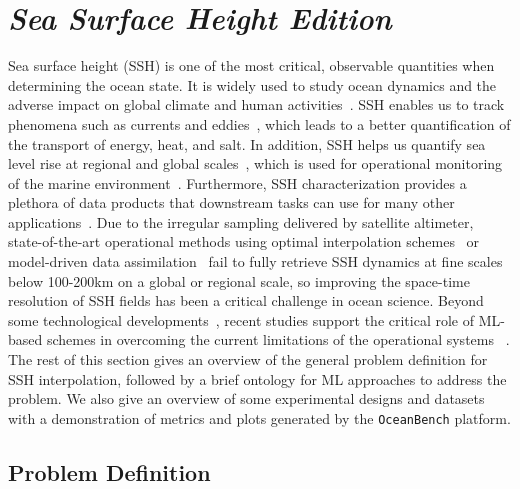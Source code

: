 \section{\textit{Sea Surface Height Edition}}\label{sec:interp_challenge}

Sea surface height (SSH) is one of the most critical, observable quantities when determining the ocean state. 
It is widely used to study ocean dynamics and the adverse impact on global climate and human activities~\cite{SSHMESOSCALE}. 
SSH enables us to track phenomena such as currents and eddies~\cite{SSHMESOSCALE,SSHMESOSCALE2,SSHMESOSCALE3}, which leads to a better quantification of the transport of energy, heat, and salt. 
In addition, SSH helps us quantify sea level rise at regional and global scales~\cite{SSHSEALEVEL,OCEANSEALEVEL}, which is used for operational monitoring of the marine environment~\cite{SSHOPERATIONAL}. 
Furthermore, SSH characterization provides a plethora of data products that downstream tasks can use for many other applications~\cite{SSH3DCIRCULATION, 3DQGOC}.
%
Due to the irregular sampling delivered by satellite altimeter, state-of-the-art operational methods using optimal interpolation schemes~\cite{DUACS, MIOST} or model-driven data assimilation~\cite{DINEOF, DINEOF2, ANALOGDA, ANALOGDA2} fail to fully retrieve SSH dynamics at fine scales below 100-200km on a global or regional scale, so improving the space-time resolution of SSH fields has been a critical challenge in ocean science. 
Beyond some technological developments~\cite{SWOT}, recent studies support the critical role of ML-based schemes in overcoming the current limitations of the operational systems~\cite{4DVARNETSWOT, BFNQG, SSHInterpAttention} .  
%
The rest of this section gives an overview of the general problem definition for SSH interpolation, followed by a brief ontology for ML approaches to address the problem. 
We also give an overview of some experimental designs and datasets with a demonstration of metrics and plots generated by the \texttt{OceanBench} platform. 



\subsection*{Problem Definition}\label{sec:prob_definition}

